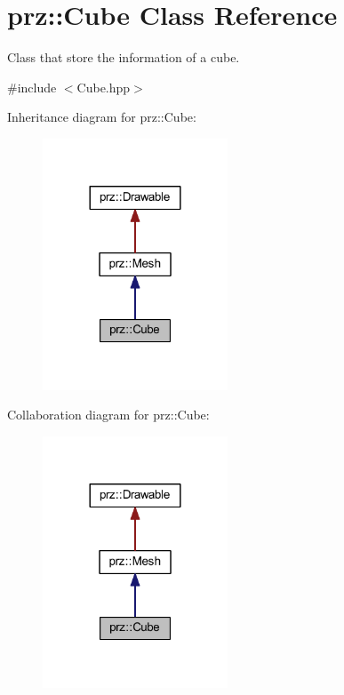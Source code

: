 \hypertarget{classprz_1_1_cube}{}\section{prz\+::Cube Class Reference}
\label{classprz_1_1_cube}


Class that store the information of a cube.  




{\ttfamily \#include $<$Cube.\+hpp$>$}



Inheritance diagram for prz\+::Cube\+:
\nopagebreak
\begin{figure}[H]
\begin{center}
\leavevmode
\includegraphics[width=156pt]{classprz_1_1_cube__inherit__graph}
\end{center}
\end{figure}


Collaboration diagram for prz\+::Cube\+:
\nopagebreak
\begin{figure}[H]
\begin{center}
\leavevmode
\includegraphics[width=156pt]{classprz_1_1_cube__coll__graph}
\end{center}
\end{figure}
